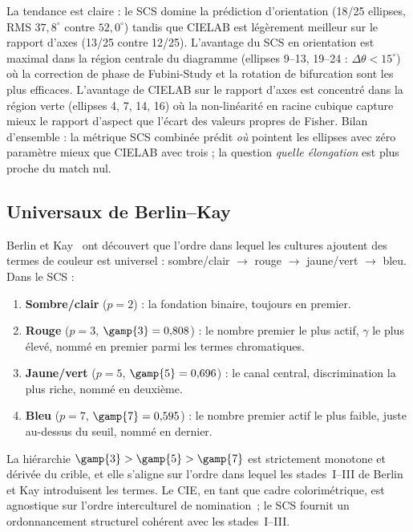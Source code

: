 \documentclass[12pt,a4paper]{article}
\begin{document}
La tendance est claire : le SCS domine la pr\'ediction d'orientation
(18/25 ellipses, RMS $37{,}8^\circ$ contre $52{,}0^\circ$) tandis que
CIELAB est l\'eg\`erement meilleur sur le rapport d'axes (13/25 contre
12/25). L'avantage du SCS en orientation est maximal dans la r\'egion
centrale du diagramme (ellipses 9--13, 19--24 :
$\Delta\theta < 15^\circ$) o\`u la correction de phase de Fubini-Study
et la rotation de bifurcation sont les plus efficaces. L'avantage de
CIELAB sur le rapport d'axes est concentr\'e dans la r\'egion verte
(ellipses 4, 7, 14, 16) o\`u la non-lin\'earit\'e en racine cubique
capture mieux le rapport d'aspect que l'\'ecart des valeurs propres de
Fisher. Bilan d'ensemble : la m\'etrique SCS combin\'ee pr\'edit
\emph{o\`u} pointent les ellipses avec z\'ero param\`etre mieux que
CIELAB avec trois ; la question \emph{quelle \'elongation} est plus
proche du match nul.

\subsection{Universaux de Berlin--Kay}

Berlin et Kay~\cite{berlinkay1969} ont d\'ecouvert que l'ordre dans lequel les
cultures ajoutent des termes de couleur est universel :
sombre/clair $\to$ rouge $\to$ jaune/vert $\to$ bleu. Dans le SCS :

\begin{enumerate}[nosep]
\item \textbf{Sombre/clair} ($p = 2$) : la fondation binaire, toujours
  en premier.
\item \textbf{Rouge} ($p = 3$, $\gamp{3} = 0{,}808$) : le nombre
  premier le plus actif, $\gamma$ le plus \'elev\'e, nomm\'e en premier
  parmi les termes chromatiques.
\item \textbf{Jaune/vert} ($p = 5$, $\gamp{5} = 0{,}696$) : le canal
  central, discrimination la plus riche, nomm\'e en deuxi\`eme.
\item \textbf{Bleu} ($p = 7$, $\gamp{7} = 0{,}595$) : le nombre premier
  actif le plus faible, juste au-dessus du seuil, nomm\'e en dernier.
\end{enumerate}

La hi\'erarchie $\gamp{3} > \gamp{5} > \gamp{7}$ est strictement
monotone et d\'eriv\'ee du crible, et elle s'aligne sur l'ordre dans
lequel les stades~I--III de Berlin et Kay introduisent les termes. Le
CIE, en tant que cadre colorim\'etrique, est agnostique sur l'ordre
interculturel de nomination~; le SCS fournit un ordonnancement
structurel coh\'erent avec les stades~I--III.
\end{document}
